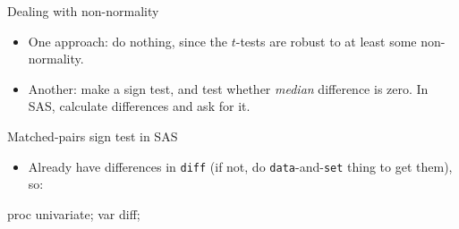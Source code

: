 \documentclass[unknownkeysallowed]{beamer}\usepackage[]{graphicx}\usepackage[]{color}
\makeatletter
\def\maxwidth{ %
  \ifdim\Gin@nat@width>\linewidth
    \linewidth
  \else
    \Gin@nat@width
  \fi
}
\newcommand{\hlopt}[1]{\textcolor[rgb]{0,0,0}{#1}}%
\newcommand{\hlstd}[1]{\textcolor[rgb]{0.345,0.345,0.345}{#1}}%
\newcommand{\hlkwd}[1]{\textcolor[rgb]{0.737,0.353,0.396}{\textbf{#1}}}%
\newenvironment{kframe}{%
 \def\at@end@of@kframe{}%
 \ifinner\ifhmode%
  \def\at@end@of@kframe{\end{minipage}}%
  \begin{minipage}{\columnwidth}%
 \fi\fi%
 \def\FrameCommand##1{\hskip\@totalleftmargin \hskip-\fboxsep
 \colorbox{shadecolor}{##1}\hskip-\fboxsep
     \hskip-\linewidth \hskip-\@totalleftmargin \hskip\columnwidth}%
 \MakeFramed {\advance\hsize-\width
   \@totalleftmargin\z@ \linewidth\hsize
   \@setminipage}}%
 {\par\unskip\endMakeFramed%
 \at@end@of@kframe}
\newenvironment{knitrout}{}{} %
\makeatother
\begin{document}

\begin{frame}[fragile]{Dealing with non-normality}

  \begin{itemize}
  \item One approach: do nothing, since the $t$-tests are robust to at
    least some non-normality.
  \item Another: make a sign test, and test whether \emph{median}
    difference is zero. In SAS, calculate differences and ask for it.

  \end{itemize}
  
\end{frame}

\begin{frame}[fragile]{Matched-pairs sign test in SAS}


  \begin{itemize}
  \item Already have differences in \texttt{diff} (if not, do
    \texttt{data}-and-\texttt{set} thing to get them), so:
  \end{itemize}
  
\begin{Sascode}[store=ihx]
proc univariate;
  var diff;  
\end{Sascode}


  
\end{frame}
\end{document}
